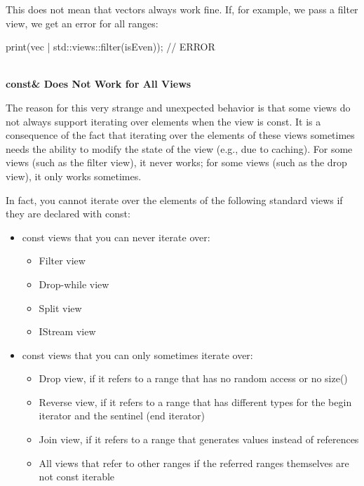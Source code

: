 This does not mean that vectors always work fine. If, for example, we pass a filter view, we get an error for all ranges:

\begin{cpp}
print(vec | std::views::filter(isEven)); // ERROR
\end{cpp}


\noindent
\hspace*{\fill} \\ %
\textbf{const\& Does Not Work for All Views}

The reason for this very strange and unexpected behavior is that some views do not always support iterating over elements when the view is const. It is a consequence of the fact that iterating over the elements of these views sometimes needs the ability to modify the state of the view (e.g., due to caching). For some views (such as the filter view), it never works; for some views (such as the drop view), it only works sometimes.

In fact, you cannot iterate over the elements of the following standard views if they are declared with const:

\begin{itemize}
\item
const views that you can never iterate over:

\begin{itemize}
\item
Filter view

\item
Drop-while view

\item
Split view

\item
IStream view
\end{itemize}

\item
const views that you can only sometimes iterate over:

\begin{itemize}
\item
Drop view, if it refers to a range that has no random access or no size()

\item
Reverse view, if it refers to a range that has different types for the begin iterator and the sentinel (end iterator)

\item
Join view, if it refers to a range that generates values instead of references

\item
All views that refer to other ranges if the referred ranges themselves are not const iterable
\end{itemize}
\end{itemize}

